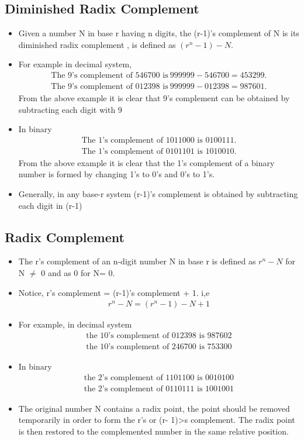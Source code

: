 \documentclass[a4paper,12pt]{article}
\begin{document}
\subsection{Diminished Radix Complement}
\begin{itemize}
    \item Given a number N in base r having n digits, the (r-1)'s complement of N is its diminished radix complement , is defined as $(r^n-1)-N$.
    \item For example in decimal system,
    \begin{align}
        \text{The 9's complement of 546700 is} \ 999999- 546700= 453299.\\
        \text {The 9's complement of 012398 is} \ 999999- 012398= 987601.
    \end{align}
    From the above example it is clear that 9's complement can be obtained by subtracting each digit with 9 
    \item In binary
    \begin{align}
        \text{The 1's complement of 1011000 is 0100111.}\\
        \text{The 1's complement of 0101101 is 1010010.}
    \end{align}
    From the above example it is clear that the 1’s complement of a binary number is formed by changing 1’s to 0’s and 0’s to 1’s. 
    \item Generally, in any base-r system (r-1)'s complement is obtained by subtracting each digit in (r-1)
\end{itemize}
\subsection{Radix Complement}
\begin{itemize}
    \item The r’s complement of an n-digit number N in base r is defined as $r^n- N$ for N $\neq$ 0 and as 0 for N= 0.
    \item Notice, r's complement = (r-1)'s complement + 1. i,e
    \begin{align}
        r^n-N=(r^n-1)-N+1
    \end{align}
    \item For example, in decimal system 
    \begin{align}
        \text{the 10's complement of 012398 is 987602}\\
        \text{the 10's complement of 246700 is 753300}
    \end{align}
    \item In binary
    \begin{align}
        \text{the 2's complement of 1101100 is 0010100}\\
        \text{the 2's complement of 0110111 is 1001001}
    \end{align}
    \item  The original number N contains a radix point, the point should be removed temporarily in order to form the r’s or (r- 1)>s complement. The radix point is then
restored to the complemented number in the same relative position.
\end{itemize}
\end{document}
